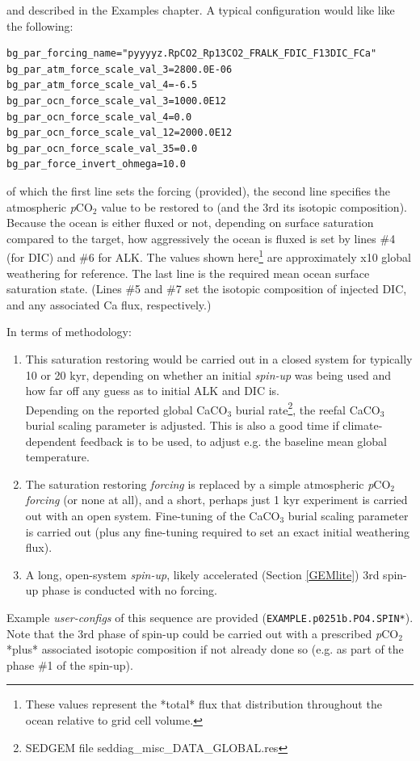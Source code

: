 \documentclass[11pt,fleqn]{book} %
\begin{document}
\begin{enumerate}
and described in the Examples chapter. A typical configuration would like like the following:
\vspace{-1mm}\small\begin{verbatim}
bg_par_forcing_name="pyyyyz.RpCO2_Rp13CO2_FRALK_FDIC_F13DIC_FCa"
bg_par_atm_force_scale_val_3=2800.0E-06
bg_par_atm_force_scale_val_4=-6.5
bg_par_ocn_force_scale_val_3=1000.0E12
bg_par_ocn_force_scale_val_4=0.0
bg_par_ocn_force_scale_val_12=2000.0E12
bg_par_ocn_force_scale_val_35=0.0
bg_par_force_invert_ohmega=10.0
\end{verbatim}\normalsize\vspace{-1mm}
of which the first line sets the forcing (provided), the second line specifies the atmospheric \textit{p}CO\(_{2}\) value to be restored to (and the 3rd its isotopic composition). Because the ocean is either fluxed or not, depending on surface saturation compared to the target, how aggressively the ocean is fluxed is set by lines \#4 (for DIC) and \#6 for ALK. The values shown here\footnote{These values represent the *total* flux that distribution throughout the ocean relative to grid cell volume.} are approximately x10 global weathering for reference. The last line is the required mean ocean surface saturation state. (Lines \#5 and \#7 set the isotopic composition of injected DIC, and any associated Ca flux, respectively.)

In terms of methodology:
\begin{enumerate}
\vspace{1mm}
        \item This saturation restoring would be carried out in a closed system for typically 10 or 20 kyr, depending on whether an initial \textit{spin-up} was being used and how far off any guess as to initial ALK and DIC is.
        \\ Depending on the reported global CaCO$_{3}$ burial rate\footnote{SEDGEM file seddiag\_misc\_DATA\_GLOBAL.res}, the reefal CaCO$_{3}$ burial scaling parameter is adjusted. This is also a good time if climate-dependent feedback is to be used, to adjust e.g. the baseline mean global temperature.
\vspace{1mm}
        \item The saturation restoring \textit{forcing} is replaced by a simple atmospheric \textit{p}CO\(_{2}\)\textit{forcing} (or none at all), and a short, perhaps just 1 kyr experiment is carried out with an open system. Fine-tuning of the CaCO$_{3}$ burial scaling parameter is carried out (plus any fine-tuning required to set an exact initial weathering flux).
\vspace{1mm}
        \item A long, open-system \textit{spin-up}, likely accelerated (Section \ref{GEMlite}) 3rd spin-up phase is conducted with no forcing.
\end{enumerate}
Example \textit{user-configs} of this sequence are provided (\texttt{EXAMPLE.p0251b.PO4.SPIN*}).
Note that the 3rd phase of spin-up could be carried out with a prescribed \textit{p}CO\(_{2}\) *plus* associated isotopic composition if not already done so (e.g. as part of the phase \#1 of the spin-up).


\end{enumerate}
\end{document}
